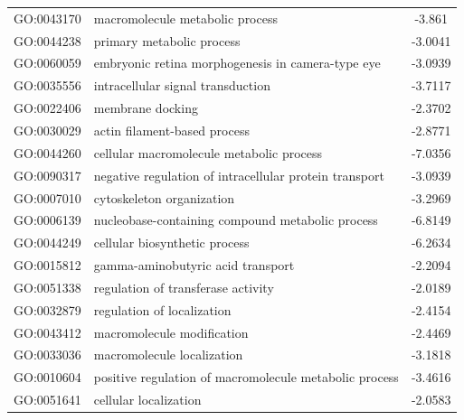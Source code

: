\documentclass[11pt,twoside,a4paper]{report}
\begin{document}
\begin{appendices}
\begin{longtable}{@{\extracolsep{\fill}}llc@{}}
    GO:0043170 & macromolecule metabolic process                                        & -3.861        \\
    GO:0044238 & primary metabolic process                                              & -3.0041       \\
    GO:0060059 & embryonic retina morphogenesis in camera-type eye                      & -3.0939       \\
    GO:0035556 & intracellular signal transduction                                      & -3.7117       \\
    GO:0022406 & membrane docking                                                       & -2.3702       \\
    GO:0030029 & actin filament-based process                                           & -2.8771       \\
    GO:0044260 & cellular macromolecule metabolic process                               & -7.0356       \\
    GO:0090317 & negative regulation of intracellular protein transport                 & -3.0939       \\
    GO:0007010 & cytoskeleton organization                                              & -3.2969       \\
    GO:0006139 & nucleobase-containing compound metabolic process                       & -6.8149       \\
    GO:0044249 & cellular biosynthetic process                                          & -6.2634       \\
    GO:0015812 & gamma-aminobutyric acid transport                                      & -2.2094       \\
    GO:0051338 & regulation of transferase activity                                     & -2.0189       \\
    GO:0032879 & regulation of localization                                             & -2.4154       \\
    GO:0043412 & macromolecule modification                                             & -2.4469       \\
    GO:0033036 & macromolecule localization                                             & -3.1818       \\
    GO:0010604 & positive regulation of macromolecule metabolic process                 & -3.4616       \\
    GO:0051641 & cellular localization                                                  & -2.0583       \\

\end{longtable}
\end{appendices}
\end{document}
